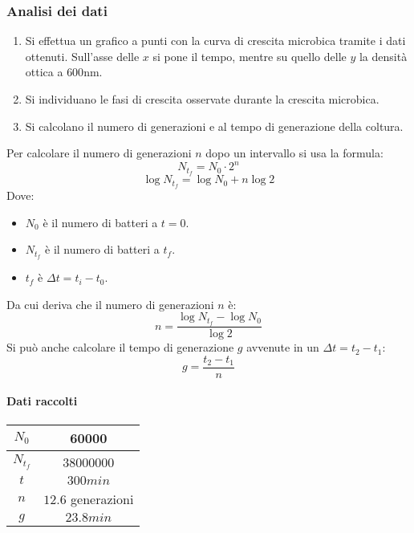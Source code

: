 		\subsubsection{Analisi dei dati}
		\begin{enumerate}
			\item Si effettua un grafico a punti con la curva di crescita microbica tramite i dati ottenuti.
				Sull'asse delle $x$ si pone il tempo, mentre su quello delle $y$ la densit\`a ottica a $600\si{\nano\metre}$.
			\item Si individuano le fasi di crescita osservate durante la crescita microbica.
			\item Si calcolano il numero di generazioni e al tempo di generazione della coltura.
		\end{enumerate}
		Per calcolare il numero di generazioni $n$ dopo un intervallo si usa la formula:
		\[N_{t_f} = N_0 \cdot 2^n\]
		\[\log N_{t_f} = \log N_0 + n\log 2\]
		Dove:
		\begin{multicols}{3}
			\begin{itemize}
				\item $N_0$ \`e il numero di batteri a $t=0$.
				\item $N_{t_f}$ \`e il numero di batteri a $t_f$.
				\item $t_f$ \`e $\Delta t = t_i - t_0$.
			\end{itemize}
		\end{multicols}
		Da cui deriva che il numero di generazioni $n$ \`e:
		\[n = \dfrac{\log N_{t_f} - \log N_0}{\log 2}\]
		Si pu\`o anche calcolare il tempo di generazione $g$ avvenute in un $\Delta t = t_2 - t_1$:
		\[g = \dfrac{t_2 - t_1}{n}\]
			
			\paragraph{Dati raccolti}
			\begin{center}
				\begin{tabular}{|c|c|}
					\hline
					$N_0$ & \num{60000}\\
					\hline
					$N_{t_f}$ & \num{38000000}\\
					\hline
					$t$ & $300 min$\\
					\hline
					$n$ & $12.6$ generazioni\\
					\hline
					$g$ & $23.8 min$\\
					\hline
				\end{tabular}
			\end{center}



